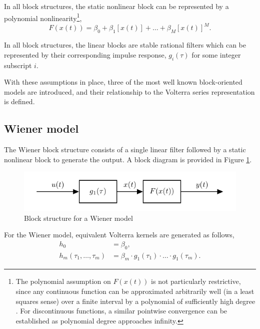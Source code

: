 \begin{assum}
\label{assum:polynomialnonlin_Chap3}
In all block structures, the static nonlinear block can be represented by a polynomial nonlinearity\footnote{The polynomial assumption on $F(x(t))$ is not particularly restrictive, since any continuous function can be approximated arbitrarily well (in a least squares sense) over a finite interval by a polynomial of sufficiently high degree \cite{Timan1963}. For discontinuous functions, a similar pointwise convergence can be established as polynomial degree approaches infinity.},
$$F(x(t)) = \beta_0 + \beta_1 [x(t)] + \hdots + \beta_M [x(t)]^M.$$
\end{assum}

\begin{assum}
\label{assum:linearblock_Chap3}
In all block structures, the linear blocks are stable rational filters which can be represented by their corresponding impulse response, $g_i(\tau)$ for some integer subscript $i$.
\end{assum}

With these assumptions in place, three of the most well known block-oriented models are introduced, and their relationship to the Volterra series representation is defined.

\subsection{Wiener model}

The Wiener block structure consists of a single linear filter followed by a static nonlinear block to generate the output. A block diagram is provided in Figure \ref{fig:WienerBS}.

\begin{figure}[!h]
\centering
\includegraphics[scale=1]{Chapter3_VolterraSeries/WienerSystem.pdf}
\caption{Block structure for a Wiener model}
\label{fig:WienerBS}
\end{figure}

For the Wiener model, equivalent Volterra kernels are generated as follows,
\begin{align}
h_0 &= \beta_0, \nonumber \\
h_m(\tau_1,\hdots,\tau_m) &= \beta_m \cdot g_1(\tau_1) \cdot \hdots \cdot g_1(\tau_m).
\end{align}

